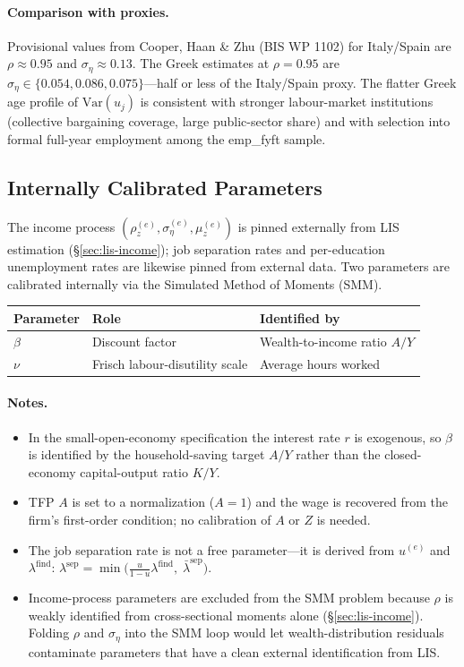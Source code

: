 \paragraph{Comparison with proxies.} Provisional values from Cooper, Haan \& Zhu (BIS WP 1102) for Italy/Spain are $\rho \approx 0.95$ and $\sigma_\eta \approx 0.13$. The Greek estimates at $\rho = 0.95$ are $\sigma_\eta \in \{0.054, 0.086, 0.075\}$---half or less of the Italy/Spain proxy. The flatter Greek age profile of $\mathrm{Var}(u_j)$ is consistent with stronger labour-market institutions (collective bargaining coverage, large public-sector share) and with selection into formal full-year employment among the \textsf{emp\_fyft} sample.

\subsection{Internally Calibrated Parameters}\label{sec:internal-cal}

The income process $(\rho_z^{(e)}, \sigma_\eta^{(e)}, \mu_z^{(e)})$ is pinned externally from LIS estimation (\S\ref{sec:lis-income}); job separation rates and per-education unemployment rates are likewise pinned from external data. Two parameters are calibrated internally via the Simulated Method of Moments (SMM).

\begin{table}[H]
\centering
\small
\begin{tabular}{lll}
\toprule
Parameter & Role & Identified by \\
\midrule
$\beta$ & Discount factor & Wealth-to-income ratio $A/Y$ \\
$\nu$ & Frisch labour-disutility scale & Average hours worked \\
\bottomrule
\end{tabular}
\end{table}

\paragraph{Notes.}
\begin{itemize}[leftmargin=*]
    \item In the small-open-economy specification the interest rate $r$ is exogenous, so $\beta$ is identified by the household-saving target $A/Y$ rather than the closed-economy capital-output ratio $K/Y$.
    \item TFP $A$ is set to a normalization ($A = 1$) and the wage is recovered from the firm's first-order condition; no calibration of $A$ or $Z$ is needed.
    \item The job separation rate is not a free parameter---it is derived from $u^{(e)}$ and $\lambda^{\text{find}}$: $\lambda^{\text{sep}} = \min\!\big(\frac{u}{1-u}\lambda^{\text{find}},\;\bar{\lambda}^{\text{sep}}\big)$.
    \item Income-process parameters are excluded from the SMM problem because $\rho$ is weakly identified from cross-sectional moments alone (\S\ref{sec:lis-income}). Folding $\rho$ and $\sigma_\eta$ into the SMM loop would let wealth-distribution residuals contaminate parameters that have a clean external identification from LIS.
\end{itemize}

